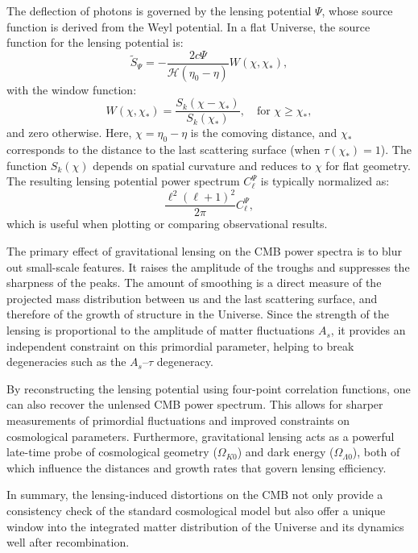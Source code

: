 \documentclass{aa}
\numberwithin{equation}{section}
\numberwithin{table}{section}
\numberwithin{figure}{section}
\begin{document}
The deflection of photons is governed by the lensing potential $\Psi$, whose source function is derived from the Weyl potential. In a flat Universe, the source function for the lensing potential is:
\begin{equation}
\tilde{S}_\Psi = -\frac{2c\Psi}{\mathcal{H}(\eta_0 - \eta)} W(\chi, \chi_*),
\end{equation}
with the window function:
\begin{equation}
W(\chi, \chi_*) = \frac{S_k(\chi - \chi_*)}{S_k(\chi_*)}, \quad \text{for } \chi \geq \chi_*,
\end{equation}
and zero otherwise. Here, $\chi = \eta_0 - \eta$ is the comoving distance, and $\chi_*$ corresponds to the distance to the last scattering surface (when $\tau(\chi_*) = 1$). The function $S_k(\chi)$ depends on spatial curvature and reduces to $\chi$ for flat geometry. The resulting lensing potential power spectrum $C_\ell^\Psi$ is typically normalized as:
\begin{equation}
\frac{\ell^
2(\ell+1)^2}{2\pi} C_\ell^\Psi,
\end{equation}
which is useful when plotting or comparing observational results.

The primary effect of gravitational lensing on the CMB power spectra is to blur out small-scale features. It raises the amplitude of the troughs and suppresses the sharpness of the peaks. The amount of smoothing is a direct measure of the projected mass distribution between us and the last scattering surface, and therefore of the growth of structure in the Universe. Since the strength of the lensing is proportional to the amplitude of matter fluctuations $A_s$, it provides an independent constraint on this primordial parameter, helping to break degeneracies such as the $A_s$--$\tau$ degeneracy.

By reconstructing the lensing potential using four-point correlation functions, one can also recover the unlensed CMB power spectrum. This allows for sharper measurements of primordial fluctuations and improved constraints on cosmological parameters. Furthermore, gravitational lensing acts as a powerful late-time probe of cosmological geometry ($\Omega_{K0}$) and dark energy ($\Omega_{\Lambda 0}$), both of which influence the distances and growth rates that govern lensing efficiency.

In summary, the lensing-induced distortions on the CMB not only provide a consistency check of the standard cosmological model but also offer a unique window into the integrated matter distribution of the Universe and its dynamics well after recombination.
\color{black}
\end{document}
